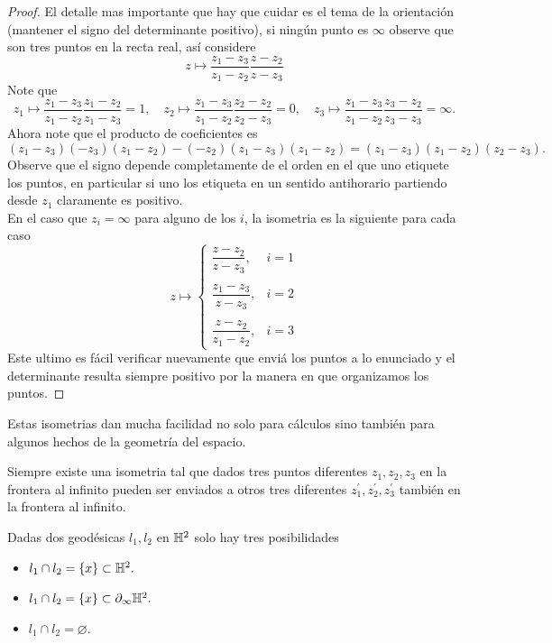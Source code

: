     \begin{proof}
       El detalle mas importante que hay que cuidar es el tema de la orientación (mantener el signo del determinante positivo), si ningún punto es $\infty$ observe que son tres puntos en la recta real, así considere
       $$z\mapsto \frac{z_1-z_3}{z_1-z_2}\frac{z-z_2}{z-z_3}$$ 
       Note que 
       $$z_1\mapsto \frac{z_1-z_3}{z_1-z_2}\frac{z_1-z_2}{z_1-z_3}=1,\quad z_2\mapsto \frac{z_1-z_3}{z_1-z_2}\frac{z_2-z_2}{z_2-z_3}=0,\quad z_3\mapsto \frac{z_1-z_3}{z_1-z_2}\frac{z_3-z_2}{z_3-z_3}=\infty.$$
       Ahora note que el producto de coeficientes es $$(z_1-z_3)(-z_3)(z_1-z_2)-(-z_2)(z_1-z_3)(z_1-z_2)=(z_1-z_3)(z_1-z_2)(z_2-z_3).$$
       Observe que el signo depende completamente de el orden en el que uno etiquete los puntos, en particular si uno los etiqueta en un sentido antihorario partiendo desde $z_1$ claramente es positivo.\\

       En el caso que $z_i=\infty$ para alguno de los $i$, la isometria es la siguiente para cada caso
       $$z\mapsto\begin{cases}
           \dfrac{z-z_2}{z-z_3},&i=1\\
           \\
           \dfrac{z_1-z_3}{z-z_3},&i=2\\
           \\
           \dfrac{z-z_2}{z_1-z_2},&i=3
       \end{cases}$$
       Este ultimo es fácil verificar nuevamente que enviá los puntos a lo enunciado y el determinante resulta siempre positivo por la manera en que organizamos los puntos.

    \end{proof}
    Estas isometrias dan mucha facilidad no solo para cálculos sino también para algunos hechos de la geometría del espacio.
    \begin{corollary}
        Siempre existe una isometria tal que dados tres puntos diferentes $z_1,z_2,z_3$ en la frontera al infinito pueden ser enviados a otros tres diferentes $z_1^\prime,z_2^\prime,z_3^\prime$ también en la frontera al infinito.
    \end{corollary}
    \begin{corollary}
        Dadas dos geodésicas $l_1,l_2$ en $\mathbb{H}^2$ solo hay tres posibilidades
        \begin{itemize}
            \item $l_1\cap l_2=\{x\}\subset \mathbb{H}^2.$
            \item $l_1\cap l_2=\{x\}\subset \partial_\infty\mathbb{H}^2.$
            \item $ l_1\cap l_2=\varnothing.$ 
        \end{itemize}
    \end{corollary}
